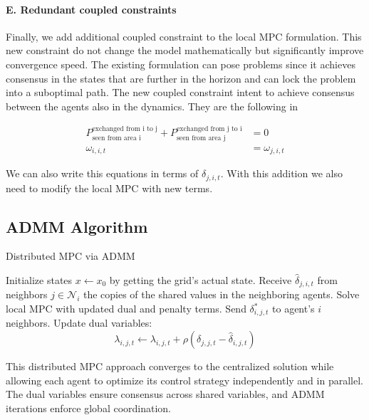\documentclass{article}
\begin{document}
\paragraph{E. Redundant coupled constraints} 

Finally, we add additional coupled constraint to the local MPC formulation. This new constraint do not change the model mathematically but significantly improve convergence speed. The existing formulation can pose problems since it achieves consensus in the states that are further in the horizon and can lock the problem into a suboptimal path. The new coupled constraint intent to achieve consensus between the agents also in the dynamics. They are the following in 

\begin{align}
    P_{\text{seen from area i}}^{\text{exchanged from i to j}} + P_{\text{seen from area j}}^{\text{exchanged from j to i}} &= 0 \\
    \omega_{i,i,t} &= \omega_{j,i,t}
\end{align}

We can also write this equations in terms of $\delta_{j,i,t}$. With this addition we also need to modify the local MPC with new terms. 

\subsection{ADMM Algorithm}

\begin{algorithm}[H]
\caption{Distributed MPC via ADMM}
\begin{algorithmic}[1]
    \State Initialize states $x \gets x_0$ by getting the grid's actual state.
            \State Receive $\hat{\delta}_{j,i,t}$ from neighbors $j \in \mathcal{N}_i$ the copies of the shared values in the neighboring agents.
            \State Solve local MPC with updated dual and penalty terms.
            \State Send $\delta^*_{i,j,t}$ to agent's $i$ neighbors. 
        \EndFor
            \State Update dual variables:
            \[
                \lambda_{i,j,t} \gets \lambda_{i,j,t} + \rho (\delta_{j,j,t} - \hat{\delta}_{i,j,t})
            \]
        \EndFor
    \EndWhile
\end{algorithmic}
\end{algorithm}

This distributed MPC approach converges to the centralized solution while allowing each agent to optimize its control strategy independently and in parallel. The dual variables ensure consensus across shared variables, and ADMM iterations enforce global coordination. 
\end{document}
